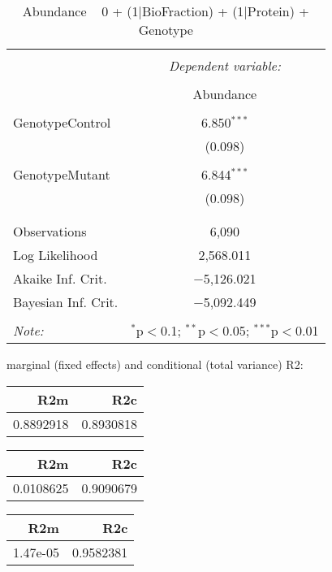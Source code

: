 \documentclass[11pt]{report}
\begin{document}
\begin{table}[!htbp] \centering 
  \caption{Abundance ~ 0 + (1|BioFraction) + (1|Protein) + Genotype} 
  \label{} 
\begin{tabular}{@{\extracolsep{5pt}}lc} 
\\[-1.8ex]\hline 
\hline \\[-1.8ex] 
 & \multicolumn{1}{c}{\textit{Dependent variable:}} \\ 
\cline{2-2} 
\\[-1.8ex] & Abundance \\ 
\hline \\[-1.8ex] 
 GenotypeControl & 6.850$^{***}$ \\ 
  & (0.098) \\ 
  & \\ 
 GenotypeMutant & 6.844$^{***}$ \\ 
  & (0.098) \\ 
  & \\ 
\hline \\[-1.8ex] 
Observations & 6,090 \\ 
Log Likelihood & 2,568.011 \\ 
Akaike Inf. Crit. & $-$5,126.021 \\ 
Bayesian Inf. Crit. & $-$5,092.449 \\ 
\hline 
\hline \\[-1.8ex] 
\textit{Note:}  & \multicolumn{1}{r}{$^{*}$p$<$0.1; $^{**}$p$<$0.05; $^{***}$p$<$0.01} \\ 
\end{tabular} 
\end{table} 
marginal (fixed effects) and conditional (total variance) R2:

\begin{tabular}{r|r}
\hline
R2m & R2c\\
\hline
0.8892918 & 0.8930818\\
\hline
\end{tabular}

\begin{tabular}{r|r}
\hline
R2m & R2c\\
\hline
0.0108625 & 0.9090679\\
\hline
\end{tabular}

\begin{tabular}{r|r}
\hline
R2m & R2c\\
\hline
1.47e-05 & 0.9582381\\
\hline
\end{tabular}
\end{document}
